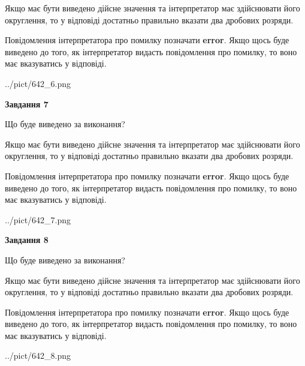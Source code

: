 \documentclass[12pt, ukrainian]{article}
\begin{document}
{\begin {Large}
Якщо має бути виведено дійсне значення та інтерпретатор має здійснювати його округлення, 
то у відповіді достатньо правильно вказати два дробових розряди.

Повідомлення інтерпретатора про помилку позначати \textbf{error}.
Якщо щось буде виведено до того, як інтерпретатор видасть повідомлення про помилку, 
то воно має вказуватись у відповіді. \par

\begin{center}
	{../pict/642_6.png}
\end{center}
\newpage

{\begin {center}\textbf{Завдання 7}\end {center}}\par
Що буде виведено за виконання? \par

Якщо має бути виведено дійсне значення та інтерпретатор має здійснювати його округлення, 
то у відповіді достатньо правильно вказати два дробових розряди.

Повідомлення інтерпретатора про помилку позначати \textbf{error}.
Якщо щось буде виведено до того, як інтерпретатор видасть повідомлення про помилку, 
то воно має вказуватись у відповіді. \par

\begin{center}
	{../pict/642_7.png}
\end{center}
\newpage

{\begin {center}\textbf{Завдання 8}\end {center}}\par
Що буде виведено за виконання? \par

Якщо має бути виведено дійсне значення та інтерпретатор має здійснювати його округлення, 
то у відповіді достатньо правильно вказати два дробових розряди.

Повідомлення інтерпретатора про помилку позначати \textbf{error}.
Якщо щось буде виведено до того, як інтерпретатор видасть повідомлення про помилку, 
то воно має вказуватись у відповіді. \par

\begin{center}
	{../pict/642_8.png}
\end{center}
\newpage


\end{Large}}
\end{document}
